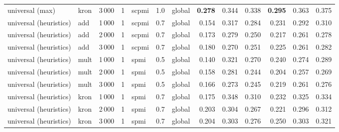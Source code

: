 \begin{tabular}{lllllllrrrrrr}
universal (max)        & kron & 3\,000 & 1     & scpmi & 1.0 & global &        \textbf{0.278} &         0.344 &           0.338 &            \textbf{0.295} &             0.363 &       0.375 \\
\addlinespace
universal (heuristics) & add  & 1\,000 & 1     & scpmi & 0.7 & global &        0.154 &         0.317 &           0.284 &            0.231 &             0.292 &       0.310 \\
universal (heuristics) & add  & 2\,000 & 1     & scpmi & 0.7 & global &        0.173 &         0.279 &           0.250 &            0.217 &             0.261 &       0.278 \\
universal (heuristics) & add  & 3\,000 & 1     & scpmi & 0.7 & global &        0.180 &         0.270 &           0.251 &            0.225 &             0.261 &       0.282 \\
\addlinespace
universal (heuristics) & mult & 1\,000 & 1     & spmi  & 0.5 & global &        0.140 &         0.321 &           0.270 &            0.240 &             0.274 &       0.289 \\
universal (heuristics) & mult & 2\,000 & 1     & spmi  & 0.5 & global &        0.158 &         0.281 &           0.244 &            0.204 &             0.257 &       0.269 \\
universal (heuristics) & mult & 3\,000 & 1     & spmi  & 0.5 & global &        0.166 &         0.273 &           0.245 &            0.219 &             0.261 &       0.276 \\
\addlinespace
universal (heuristics) & kron & 1\,000 & 1     & spmi  & 0.7 & global &        0.175 &         0.348 &           0.310 &            0.232 &             0.325 &       0.334 \\
universal (heuristics) & kron & 2\,000 & 1     & spmi  & 0.7 & global &        0.203 &         0.304 &           0.267 &            0.221 &             0.296 &       0.312 \\
universal (heuristics) & kron & 3\,000 & 1     & spmi  & 0.7 & global &        0.204 &         0.303 &           0.276 &            0.250 &             0.303 &       0.321 \\
\bottomrule
\end{tabular}
